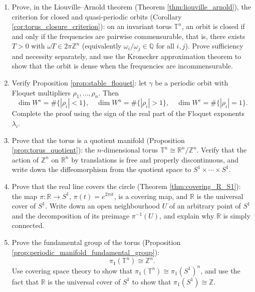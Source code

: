 \begin{enumerate}[leftmargin=3em, label=\textbf{Exercise \arabic*}]
    \item Prove, in the Liouville--Arnold theorem (Theorem \ref{thm:liouville_arnold}), the criterion for closed and quasi-periodic orbits (Corollary \ref{cor:torus_closure_criterion}):
    on an invariant torus $\mathbb{T}^n$, an orbit is closed if and only if the frequencies are pairwise commensurable, that is, there exists $T>0$ with $\omega T\in2\pi\mathbb{Z}^n$ (equivalently $\omega_i/\omega_j\in\mathbb{Q}$ for all $i,j$).
    Prove sufficiency and necessity separately, and use the Kronecker approximation theorem to show that the orbit is dense when the frequencies are incommensurable.

    \item Verify Proposition \ref{prop:stable_floquet}:
    let $\gamma$ be a periodic orbit with Floquet multipliers $\rho_1,\dots,\rho_n$. Then
    \[
    \dim W^s=\#\{|\rho_i|<1\},\quad
    \dim W^u=\#\{|\rho_i|>1\},\quad
    \dim W^c=\#\{|\rho_i|=1\}.
    \]
    Complete the proof using the sign of the real part of the Floquet exponents $\lambda_i$.

    \item Prove that the torus is a quotient manifold (Proposition \ref{prop:torus_quotient}):
    the $n$-dimensional torus $\mathbb{T}^n\cong\mathbb{R}^n/\mathbb{Z}^n$.
    Verify that the action of $\mathbb{Z}^n$ on $\mathbb{R}^n$ by translations is free and properly discontinuous,
    and write down the diffeomorphism from the quotient space to $S^1\times\cdots\times S^1$.

    \item Prove that the real line covers the circle (Theorem \ref{thm:covering_R_S1}):
    the map $\pi:\mathbb{R}\to S^1$, $\pi(t)=e^{2\pi it}$, is a covering map,
    and $\mathbb{R}$ is the universal cover of $S^1$.
    Write down an open neighbourhood $U$ of an arbitrary point of $S^1$ and the decomposition of its preimage $\pi^{-1}(U)$,
    and explain why $\mathbb{R}$ is simply connected.

    \item Prove the fundamental group of the torus (Proposition \ref{prop:periodic_manifold_fundamental_group}):
    \[
    \pi_1(\mathbb{T}^n)\cong\mathbb{Z}^n.
    \]
    Use covering space theory to show that $\pi_1(\mathbb{T}^n)\cong\pi_1(S^1)^n$,
    and use the fact that $\mathbb{R}$ is the universal cover of $S^1$ to show that $\pi_1(S^1)\cong\mathbb{Z}$.


\end{enumerate}
